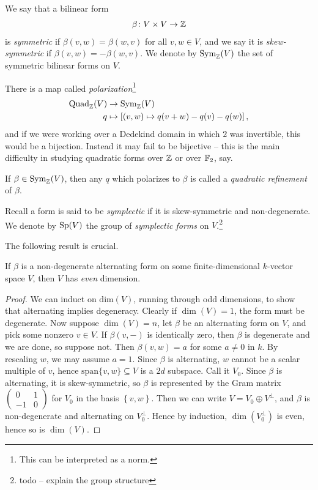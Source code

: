 \documentclass[11pt]{amsart}
\providecommand{\Quad}{\mathrm{Quad}}
\begin{document}
\begin{definition} We say that a bilinear form
\begin{align*}
    \beta \colon V \times V \to \mathbb{Z}
\end{align*}
is \textit{symmetric} if $\beta(v,w) = \beta(w,v)$ for all $v,w\in V$, and we say it is \textit{skew-symmetric} if $\beta(v,w) = - \beta(w,v)$. We denote by $\mathrm{Sym}_{\mathbb{Z}}(V)$ the set of symmetric bilinear forms on $V$.
\end{definition}

There is a map called \textit{polarization}\footnote{This can be interpreted as a norm.}
\begin{align*}
    \Quad_\Z(V) &\to \Sym_\Z(V) \\
    q &\mapsto \left[ (v,w) \mapsto q(v+w)-q(v)-q(w) \right],
\end{align*}
and if we were working over a Dedekind domain in which $2$ was invertible, this would be a bijection. Instead it may fail to be bijective -- this is the main difficulty in studying quadratic forms over $\mathbb{Z}$ or over $\mathbb{F}_2$, say.

\begin{terminology} If $\beta \in \mathrm{Sym}_{\mathbb{Z}}(V)$, then any $q$ which polarizes to $\beta$ is called a \textit{quadratic refinement} of $\beta$.
\end{terminology}


\begin{definition} Recall a form is said to be \textit{symplectic} if it is skew-symmetric and non-degenerate. We denote by $\mathrm{Sp}(V)$ the group of \textit{symplectic forms} on $V$.\footnote{todo -- explain the group structure}
\end{definition}

The following result is crucial.

\begin{proposition} If $\beta$ is a non-degenerate alternating form on some finite-dimensional $k$-vector space $V$, then $V$ has \emph{even} dimension.
\end{proposition}
\begin{proof} We can induct on $\text{dim}(V)$, running through odd dimensions, to show that alternating implies degeneracy. Clearly if $\dim(V)=1$, the form must be degenerate. Now suppose $\dim(V) = n$, let $\beta$ be an alternating form on $V$, and pick some nonzero $v\in V$. If $\beta(v,-)$ is identically zero, then $\beta$ is degenerate and we are done, so suppose not. Then $\beta(v,w) = a$ for some $a\ne 0$ in $k$. By rescaling $w$, we may assume $a=1$. Since $\beta$ is alternating, $w$ cannot be a scalar multiple of $v$, hence $\text{span}\{v,w\} \subseteq V$ is a $2d$ subspace. Call it $V_0$. Since $\beta$ is alternating, it is skew-symmetric, so $\beta$ is represented by the Gram matrix $\begin{pmatrix} 0 & 1 \\ -1 & 0 \end{pmatrix}$ for $V_0$ in the basis $\left\{ v,w \right\}$. Then we can write $V = V_0 \oplus V^\perp$, and $\beta$ is non-degenerate and alternating on $V_0^\perp$. Hence by induction, $\dim(V_0^\perp)$ is even, hence so is $\dim(V)$.
\end{proof}
\end{document}
